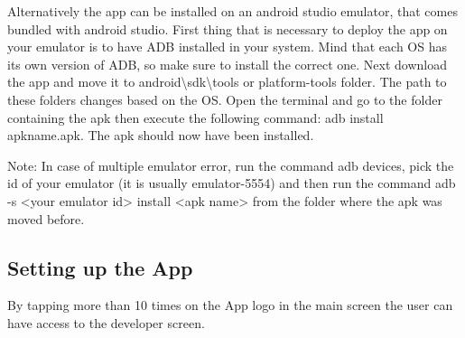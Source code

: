 Alternatively the app can be installed on an android studio emulator, that comes bundled with android studio.
First thing that is necessary to deploy the app on your emulator is to have ADB installed in your system. Mind that each OS has its own version of ADB, so make sure to install the correct one.
Next download the app and move it to android\textbackslash{}sdk\textbackslash{}tools or platform-tools folder. The path to these folders changes based on the OS.
Open the terminal and go to the folder containing the apk then execute the following command:
adb install apkname.apk.
The apk should now have been installed.

Note: In case of multiple emulator error, run the command adb devices, pick the id of your emulator (it is usually emulator-5554) and then run the command adb -s <your emulator id> install <apk name> from the folder where the apk was moved before.


\subsection{Setting up the App}

By tapping more than 10 times on the App logo in the main screen the user can have access to the developer screen.


